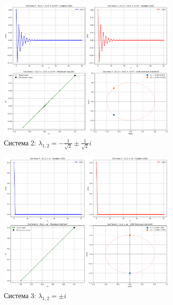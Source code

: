 \begin{figure}[h!]
\centering
\includegraphics[width=0.8\textwidth]{images/task2/system_2_lambda_minus_1_sqrt2_pm_i_sqrt2.png}
\caption{Система 2: $\lambda_{1,2} = -\frac{1}{\sqrt{2}} \pm \frac{1}{\sqrt{2}}i$}
\label{fig:discrete2}
\end{figure}

\begin{figure}[h!]
\centering
\includegraphics[width=0.8\textwidth]{images/task2/system_3_lambda_pm_i.png}
\caption{Система 3: $\lambda_{1,2} = \pm i$}
\label{fig:discrete3}
\end{figure}

